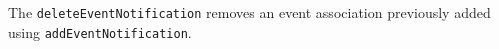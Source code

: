 The \verb+deleteEventNotification+ removes an event association previously added using \verb+addEventNotification+.
